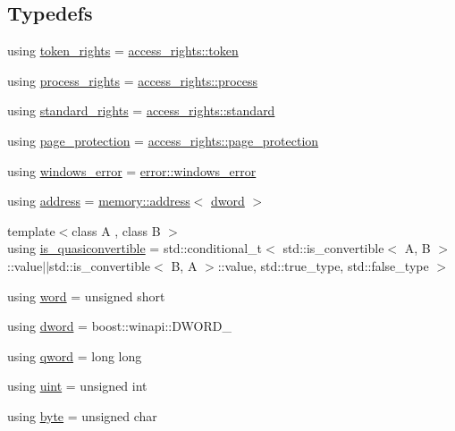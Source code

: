 \subsection*{Typedefs}
\begin{DoxyCompactItemize}
\item 
using \mbox{\hyperlink{namespacedistant_a095c3f8e5fe6b6f524c18b63e4ba7aaa}{token\+\_\+rights}} = \mbox{\hyperlink{structdistant_1_1access__rights_a6b4d9e837868c8c15cf407e4c80d7f3c}{access\+\_\+rights\+::token}}
\item 
using \mbox{\hyperlink{namespacedistant_ad7e4772f7cb4a98274a1db27d150bb3f}{process\+\_\+rights}} = \mbox{\hyperlink{structdistant_1_1access__rights_ae153052a690584111c46ec7a78d1ef81}{access\+\_\+rights\+::process}}
\item 
using \mbox{\hyperlink{namespacedistant_a8271b0fb08b7c0b4f0e1420ef3734393}{standard\+\_\+rights}} = \mbox{\hyperlink{structdistant_1_1access__rights_a1aa121d7e246b51f7386f992adce1664}{access\+\_\+rights\+::standard}}
\item 
using \mbox{\hyperlink{namespacedistant_a05f6dcaa035f968ca53579be93fe1157}{page\+\_\+protection}} = \mbox{\hyperlink{structdistant_1_1access__rights_a09c6caea8f570f8e2d18c3ef2e2a7804}{access\+\_\+rights\+::page\+\_\+protection}}
\item 
using \mbox{\hyperlink{namespacedistant_a72bfe7b4631ab280678b0b02ac38c8ab}{windows\+\_\+error}} = \mbox{\hyperlink{classdistant_1_1error_1_1windows__error}{error\+::windows\+\_\+error}}
\item 
using \mbox{\hyperlink{namespacedistant_a9d7aa6e07cb2f50321e29c209f9a7886}{address}} = \mbox{\hyperlink{classdistant_1_1memory_1_1address}{memory\+::address}}$<$ \mbox{\hyperlink{namespacedistant_a9fa41a5a1a17dcbd24da1c1855c92489}{dword}} $>$
\item 
{\footnotesize template$<$class A , class B $>$ }\\using \mbox{\hyperlink{namespacedistant_a5aaf0aee23e381d421c833f927f4ff34}{is\+\_\+quasiconvertible}} = std\+::conditional\+\_\+t$<$ std\+::is\+\_\+convertible$<$ A, B $>$\+::value$\vert$$\vert$std\+::is\+\_\+convertible$<$ B, A $>$\+::value, std\+::true\+\_\+type, std\+::false\+\_\+type $>$
\item 
using \mbox{\hyperlink{namespacedistant_a615d26c8218c108ba83dfea768c0e130}{word}} = unsigned short
\item 
using \mbox{\hyperlink{namespacedistant_a9fa41a5a1a17dcbd24da1c1855c92489}{dword}} = boost\+::winapi\+::\+D\+W\+O\+R\+D\+\_\+
\item 
using \mbox{\hyperlink{namespacedistant_ac5f83107c559f04950d4c9fa5464364e}{qword}} = long long
\item 
using \mbox{\hyperlink{namespacedistant_af3c2023269e188e3cb45f57d6e2a2b8b}{uint}} = unsigned int
\item 
using \mbox{\hyperlink{namespacedistant_af9c3f04a9b855a1368d6c1a9ce28c2f4}{byte}} = unsigned char
\end{DoxyCompactItemize}
